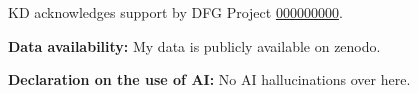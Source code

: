 \documentclass{eceasst}
\newcommand{\geprislink}[1]{\href{https://gepris.dfg.de/gepris/projekt/#1?language=en}{#1}}
\newenvironment{aiuse}{%
  \par\vspace{11pt}%
  \noindent\textbf{Declaration on the use of AI:}\enspace}{%
  \par\vspace{11pt}}
\newenvironment{data}{%
  \par\vspace{11pt}%
  \noindent\textbf{Data availability:}\enspace}{%
  \par\vspace{11pt}}
\begin{document}
\begin{acknowledge}
KD acknowledges support by DFG Project \geprislink{000000000}.
\end{acknowledge}

\begin{data}
My data is publicly available on zenodo.
\end{data}

\begin{aiuse}
No AI hallucinations over here.
\end{aiuse}



\end{document}
